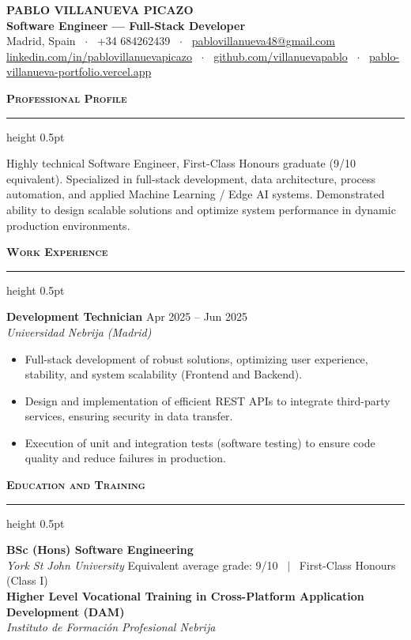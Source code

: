 \documentclass[10pt,a4paper]{article}
\newcommand{\cvsection}[1]{%
  \vspace{0.45em}%
  {\large\textbf{\textsc{#1}}}\\[-0.5em]%
  {\color{primary}\hrule height 0.5pt}%
  \vspace{0.35em}%
}
\begin{document}
\begin{center}
  {\LARGE \textbf{PABLO VILLANUEVA PICAZO}}\\[0.2em]
  {\large \textcolor{accent}{\textbf{Software Engineer --- Full-Stack Developer}}}\\[0.25em]
  Madrid, Spain \ $\cdot$ \ +34 684262439 \ $\cdot$ \ \href{mailto:pablovillanueva48@gmail.com}{pablovillanueva48@gmail.com}\\[0.15em]
  \href{https://linkedin.com/in/pablovillanuevapicazo}{linkedin.com/in/pablovillanuevapicazo} \ $\cdot$ \ 
  \href{https://github.com/villanuevapablo}{github.com/villanuevapablo} \ $\cdot$ \ 
  \href{https://pablo-villanueva-portfolio.vercel.app}{pablo-villanueva-portfolio.vercel.app}
\end{center}

\vspace{0.25em}

\cvsection{Professional Profile}
Highly technical Software Engineer, First-Class Honours graduate (9/10 equivalent). Specialized in full-stack development, data architecture, process automation, and applied Machine Learning / Edge AI systems. Demonstrated ability to design scalable solutions and optimize system performance in dynamic production environments.

\cvsection{Work Experience}
\textbf{Development Technician} \hfill Apr 2025 -- Jun 2025\\
\textit{Universidad Nebrija (Madrid)}
\begin{itemize}[leftmargin=1.2em, itemsep=1.2pt, topsep=1.5pt]
  \item Full-stack development of robust solutions, optimizing user experience, stability, and system scalability (Frontend and Backend).
  \item Design and implementation of efficient REST APIs to integrate third-party services, ensuring security in data transfer.
  \item Execution of unit and integration tests (software testing) to ensure code quality and reduce failures in production.
\end{itemize}

\cvsection{Education and Training}
\textbf{BSc (Hons) Software Engineering}\\
\textit{York St John University} \hfill Equivalent average grade: 9/10 \ $\vert$ \ First-Class Honours (Class I)\\[0.2em]
\textbf{Higher Level Vocational Training in Cross-Platform Application Development (DAM)}\\
\textit{Instituto de Formación Profesional Nebrija}
\end{document}
